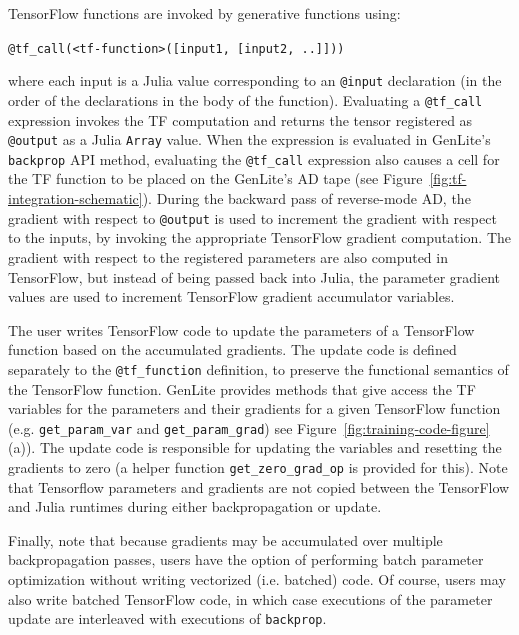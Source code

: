 TensorFlow functions are invoked by generative functions using:
\begin{center}
    \texttt{@tf\_call(<tf-function>([input1, [input2, ..]]))}
\end{center}
where each input is a Julia value corresponding to an \texttt{@input} declaration (in the order of the declarations in the body of the function).
Evaluating a \texttt{@tf\_call} expression invokes the TF computation and returns the tensor registered as \texttt{@output} as a Julia \texttt{Array} value.
When the expression is evaluated in GenLite's \texttt{backprop} API method, evaluating the \texttt{@tf\_call} expression also causes a cell for the TF function to be placed on the GenLite's AD tape (see Figure~\ref{fig:tf-integration-schematic}).
During the backward pass of reverse-mode AD, the gradient with respect to \texttt{@output} is used to increment the gradient with respect to the inputs, by invoking the appropriate TensorFlow gradient computation.
The gradient with respect to the registered parameters are also computed in TensorFlow, but instead of being passed back into Julia, the parameter gradient values are used to increment TensorFlow gradient accumulator variables.

The user writes TensorFlow code to update the parameters of a TensorFlow function based on the accumulated gradients.
The update code is defined separately to the \texttt{@tf\_function} definition, to preserve the functional semantics of the TensorFlow function.
GenLite provides methods that give access the TF variables for the parameters and their gradients for a given TensorFlow function (e.g. \texttt{get\_param\_var} and \texttt{get\_param\_grad}) see Figure~\ref{fig:training-code-figure}(a)).
The update code is responsible for updating the variables and resetting the gradients to zero (a helper function \texttt{get\_zero\_grad\_op} is provided for this).
Note that Tensorflow parameters and gradients are not copied between the TensorFlow and Julia runtimes during either backpropagation or update.

Finally, note that because gradients may be accumulated over multiple backpropagation passes, users have the option of performing batch parameter optimization without writing vectorized (i.e. batched) code.
Of course, users may also write batched TensorFlow code, in which case executions of the parameter update are interleaved with executions of \texttt{backprop}.

